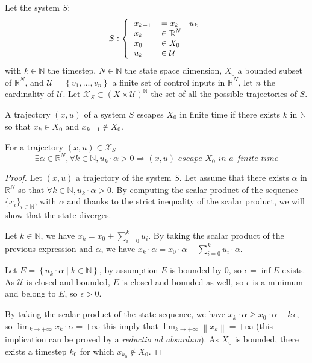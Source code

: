 Let the system $S$:
\begin{equation}
S:\left \{
  \begin{tabular}{ll}
  $x_{k+1}$ &$= x_k + u_k$\\
  $x_k$ & $\in \mathbb{R}^N$\\
  $x_0$ & $\in X_0$\\
  $u_k$ & $\in \mathcal{U}$
  \end{tabular}
\right.
\end{equation}
with $k \in \mathbb{N}$ the timestep, $N \in \mathbb{N}$ the state space dimension, $X_0$ a bounded subset of $\mathbb{R}^N$, and $\mathcal{U} = \left \{v_1,...,v_n \right \}$ a finite set of control inputs in $\mathbb{R}^N$, let $n$ the cardinality of $\mathcal{U}$.
Let $\mathcal{X}_S \subset (X \times \mathcal{U})^{\mathbb{N}}$ the set of all the possible trajectories of $S$.

\begin{definition}
A trajectory $(x,u)$ of a system $S$ escapes $X_0$ in finite time if there exists $k$ in $\mathbb{N}$ so that $x_k \in X_0$ and $x_{k+1} \notin X_0$.
\end{definition}

\begin{property} \label{prop_escape}
For a trajectory $(x,u) \in \mathcal{X}_S$ 
$$
\exists \alpha \in \mathbb{R}^N, \forall k \in \mathbb{N}, u_k \cdot \alpha > 0
\Rightarrow
(x,u) \textit{ escape } X_0 \textit{ in a finite time} 
$$
\end{property}

\begin{proof}
Let $(x,u)$ a trajectory of the system $S$.
Let assume that there exists $\alpha$ in $\mathbb{R}^N$ so that $\forall k \in \mathbb{N}, u_k \cdot \alpha > 0$.
By computing the scalar product of the sequence $\{x_i \}_{i \in \mathbb{N}}$, with $\alpha$ and thanks to the strict inequality of the scalar product, we will show that the state diverges.

Let $k \in \mathbb{N}$, we have $x_{k} = x_0 + \sum_{i=0}^{k} u_i$.
By taking the scalar product of the previous expression and $\alpha$, we have $x_k \cdot \alpha = x_0 \cdot \alpha + \sum_{i=0}^{k} u_i \cdot \alpha$.
 
Let $E = \left \{ u_k \cdot \alpha \mid k \in \mathbb{N} \right \}$, by assumption $E$ is bounded by 0, so $\epsilon  = \inf E$ exists. As $\mathcal{U}$ is closed and bounded, $E$ is closed and bounded as well, so $\epsilon$ is a minimum and belong to $E$, so $\epsilon > 0$.

By taking the scalar product of the state sequence, we have $x_k \cdot \alpha \geq x_0 \cdot \alpha + k \, \epsilon$, so $\lim_{k \rightarrow + \infty} x_k \cdot \alpha = +\infty$ this imply that $\lim_{k \rightarrow + \infty} \left \| x_k \right \| = +\infty$ (this implication can be proved by a \textit{reductio ad absurdum}).
As $X_0$ is bounded, there exists a timestep $k_0$ for which $x_{k_0} \notin X_0$.
\end{proof}

